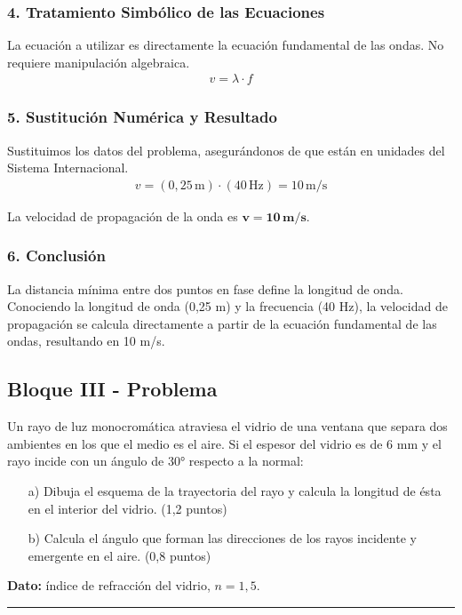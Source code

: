 \subsubsection*{4. Tratamiento Simbólico de las Ecuaciones}
La ecuación a utilizar es directamente la ecuación fundamental de las ondas. No requiere manipulación algebraica.
\begin{gather}
    v = \lambda \cdot f
\end{gather}

\subsubsection*{5. Sustitución Numérica y Resultado}
Sustituimos los datos del problema, asegurándonos de que están en unidades del Sistema Internacional.
\begin{gather}
    v = (0,25\,\text{m}) \cdot (40\,\text{Hz}) = 10\,\text{m/s}
\end{gather}
\begin{cajaresultado}
La velocidad de propagación de la onda es $\boldsymbol{v = 10\,\textbf{m/s}}$.
\end{cajaresultado}

\subsubsection*{6. Conclusión}
\begin{cajaconclusion}
La distancia mínima entre dos puntos en fase define la longitud de onda. Conociendo la longitud de onda (0,25 m) y la frecuencia (40 Hz), la velocidad de propagación se calcula directamente a partir de la ecuación fundamental de las ondas, resultando en 10 m/s.
\end{cajaconclusion}

\newpage

\subsection{Bloque III - Problema}
\label{subsec:B3_2013_jul_ext}

\begin{cajaenunciado}
Un rayo de luz monocromática atraviesa el vidrio de una ventana que separa dos ambientes en los que el medio es el aire. Si el espesor del vidrio es de 6 mm y el rayo incide con un ángulo de 30° respecto a la normal:
\begin{enumerate}
    \item[a)] Dibuja el esquema de la trayectoria del rayo y calcula la longitud de ésta en el interior del vidrio. (1,2 puntos)
    \item[b)] Calcula el ángulo que forman las direcciones de los rayos incidente y emergente en el aire. (0,8 puntos)
\end{enumerate}
\textbf{Dato:} índice de refracción del vidrio, $n=1,5$.
\end{cajaenunciado}
\hrule

